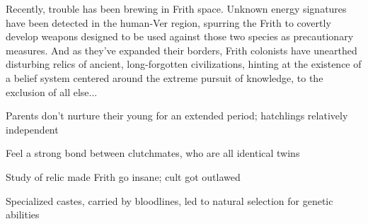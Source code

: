 \documentclass[blue]{guildcamp4}
\begin{document}
Recently, trouble has been brewing in Frith space. Unknown energy signatures have been detected in the human-Ver region, spurring the Frith to covertly develop weapons designed to be used against those two species as precautionary measures. And as they've expanded their borders, Frith colonists have unearthed disturbing relics of ancient, long-forgotten civilizations, hinting at the existence of a belief system centered around the extreme pursuit of knowledge, to the exclusion of all else...
	
\begin{itemz}[To add]
\item Parents don't nurture their young for an extended period; hatchlings relatively independent
\item Feel a strong bond between clutchmates, who are all identical twins
\item Study of relic made Frith go insane; cult got outlawed
\item Specialized castes, carried by bloodlines, led to natural selection for genetic abilities 

\end{itemz}
	
\end{document}
